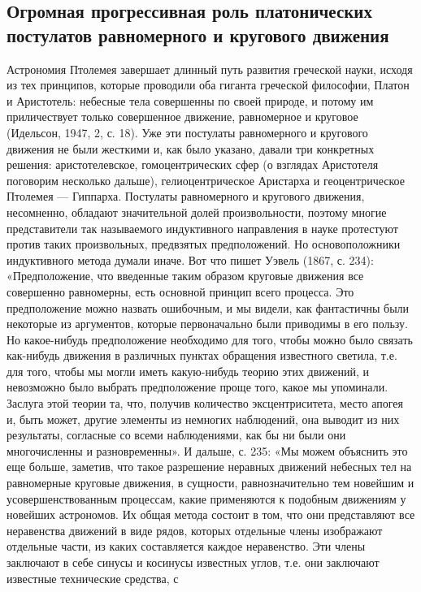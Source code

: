 \subsection{Огромная прогрессивная роль платонических постулатов
равномерного и кругового движения}

Астрономия Птолемея завершает длинный путь развития греческой
науки, исходя из тех принципов, которые проводили оба гиганта
греческой философии, Платон и Аристотель: небесные тела совершенны по
своей природе, и потому им приличествует только совершенное движение,
равномерное и круговое (Идельсон, 1947, 2, с. 18). Уже эти постулаты
равномерного и кругового движения не были жесткими и, как было
указано, давали три конкретных решения: аристотелевское,
гомоцентрических сфер (о взглядах Аристотеля поговорим несколько
дальше), гелиоцентрическое Аристарха и геоцентрическое Птолемея ---
Гиппарха. Постулаты равномерного и кругового движения, несомненно,
обладают значительной долей произвольности, поэтому многие
представители так называемого индуктивного направления в науке
протестуют против таких произвольных, предвзятых предположений. Но
основоположники индуктивного метода думали иначе. Вот что пишет Уэвель
(1867, с. 234): «Предположение, что введенные таким образом круговые
движения все совершенно равномерны, есть основной принцип всего
процесса. Это предположение можно назвать ошибочным, и мы видели, как
фантастичны были некоторые из аргументов, которые первоначально были
приводимы в его пользу. Но какое-нибудь предположение необходимо для
того, чтобы можно было связать как-нибудь движения в различных пунктах
обращения известного светила, т.е. для того, чтобы мы могли иметь
какую-нибудь теорию этих движений, и невозможно было выбрать
предположение проще того, какое мы упоминали. Заслуга этой теории та,
что, получив количество эксцентриситета, место апогея и, быть может,
другие элементы из немногих наблюдений, она выводит из них результаты,
согласные со всеми наблюдениями, как бы ни были они многочисленны и
разновременны». И дальше, с. 235: «Мы можем объяснить это еще больше,
заметив, что такое разрешение неравных движений небесных тел на
равномерные круговые движения, в сущности, равнозначительно тем
новейшим и усовершенствованным процессам, какие применяются к подобным
движениям у новейших астрономов. Их общая метода состоит в том, что
они представляют все неравенства движений в виде рядов, которых
отдельные члены изображают отдельные части, из каких составляется
каждое неравенство. Эти члены заключают в себе синусы и косинусы
известных углов, т.е. они заключают известные технические средства, с
